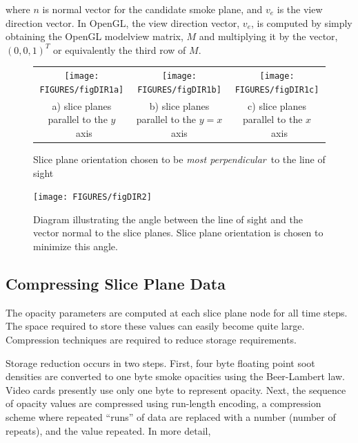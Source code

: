 {\noindent where $n$ is normal vector for the candidate smoke plane, and $v_e$ is the view direction vector.  In OpenGL, the view direction vector, $v_e$, is computed by simply obtaining the OpenGL modelview matrix, $M$ and multiplying it by the vector, $(0,0,1)^T$ or equivalently the third row of $M$.

\begin{figure}
\begin{tabular}{ccc}
\texttt{[image: FIGURES/figDIR1a]}&
\texttt{[image: FIGURES/figDIR1b]}&
\texttt{[image: FIGURES/figDIR1c]}\\
a) slice planes parallel to the $y$~axis& b) slice planes parallel
to the $y=x$ axis&
c) slice planes parallel to the $x$~axis\\
\end{tabular}
\caption{Slice plane orientation chosen to be {\em most perpendicular}\ to the line of sight }
\label{figDIRA}
\end{figure}

\begin{figure}
\centerline{\texttt{[image: FIGURES/figDIR2]}}
\caption[Diagram illustrating the angle between the line of sight
and the vector normal to the slice planes.]{Diagram illustrating the angle between the line of sight
and the vector normal to the slice planes.  Slice plane orientation is chosen to minimize
this angle.} \label{figDIRB}
\end{figure}


\subsection{Compressing Slice Plane Data}

The opacity parameters are computed at each slice plane node for
all time steps. The space required to store these values can
easily become quite large. Compression techniques are required to
reduce storage requirements.

Storage reduction occurs in two steps.  First, four byte floating
point soot densities are converted to one byte smoke opacities
using the Beer-Lambert law.  Video cards presently use only one
byte to represent opacity. Next, the sequence of opacity values
are compressed using run-length encoding, a compression scheme
where repeated ``runs'' of data are replaced with a number (number
of repeats), and the value repeated.  In more detail,


}
